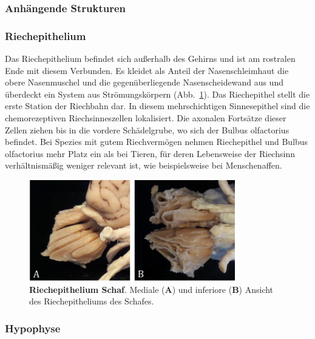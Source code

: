\subsubsection{Anhängende Strukturen}
\label{subsubsec:Hirnanhangsstrukturen}

\subsubsection*{Riechepithelium} 

Das Riechepithelium befindet sich außerhalb des Gehirns und ist am rostralen Ende mit diesem Verbunden. Es kleidet als Anteil der Nasenschleimhaut die obere Nasenmuschel und die gegenüberliegende Nasenscheidewand aus und überdeckt  ein  System aus Strömungskörpern (Abb.~\ref{fig:Riechepithel}). Das Riechepithel stellt die erste Station der Riechbahn dar. In diesem mehrschichtigen Sinnesepithel sind die chemorezeptiven Riechsinneszellen lokalisiert. Die axonalen Fortsätze dieser Zellen ziehen bis in die vordere Schädelgrube, wo sich der Bulbus olfactorius befindet. Bei Spezies mit gutem Riechvermögen nehmen Riechepithel und Bulbus olfactorius mehr Platz ein als bei Tieren, für deren Lebensweise der Riechsinn verhältnismäßig weniger relevant ist, wie beispielsweise bei Menschenaffen.

\begin{figure}[H]
    \centering
    \includegraphics[width=0.8\textwidth]{pictures/Bilder_Jule/Schaf/Ausschnitte/Riechepithel.png}
    \caption[Riechepithelium Schaf]{\textbf{Riechepithelium Schaf}. Mediale (\textbf{A}) und inferiore (\textbf{B}) Ansicht des Riechepitheliums des Schafes.}
    \label{fig:Riechepithel}
\end{figure}{}


\subsubsection*{Hypophyse}
\label{subsubsec:hypophyse} 

